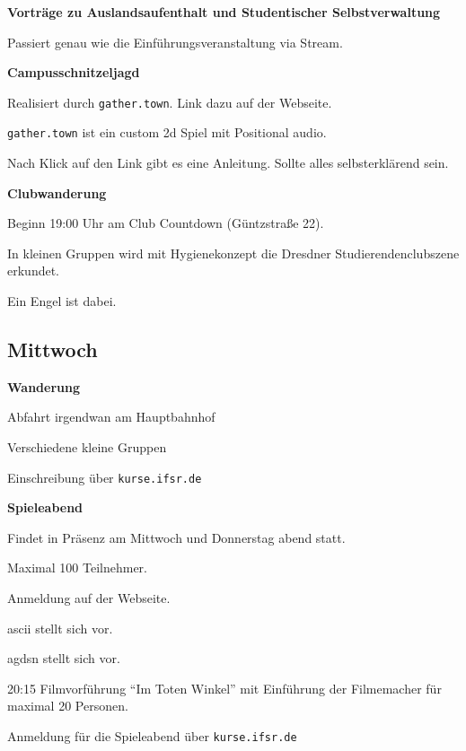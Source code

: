 \documentclass[a4paper,12pt]{scrreprt}
\begin{document}
\textbf{Vorträge zu Auslandsaufenthalt und Studentischer Selbstverwaltung}
\begin{itemize*}
    \item Passiert genau wie die Einführungsveranstaltung via Stream.
\end{itemize*}

\textbf{Campusschnitzeljagd}
\begin{itemize*}
    \item Realisiert durch \texttt{gather.town}. Link dazu auf der Webseite.
    \item \texttt{gather.town} ist ein custom 2d Spiel mit Positional audio.
    \item Nach Klick auf den Link gibt es eine Anleitung. Sollte alles selbsterklärend sein.
\end{itemize*}

\textbf{Clubwanderung}
\begin{itemize*}
    \item Beginn 19:00 Uhr am Club Countdown (Güntzstraße 22).
    \item In kleinen Gruppen wird mit Hygienekonzept die Dresdner Studierendenclubszene erkundet.
    \item Ein Engel ist dabei.
\end{itemize*}


\subsection{Mittwoch}

\textbf{Wanderung}
\begin{itemize*}
    \item Abfahrt irgendwan am Hauptbahnhof
    \item Verschiedene kleine Gruppen
    \item Einschreibung über \texttt{kurse.ifsr.de}
\end{itemize*}


\textbf{Spieleabend}
\begin{itemize*}
    \item Findet in Präsenz am Mittwoch und Donnerstag abend statt.
    \item Maximal 100 Teilnehmer.
    \item Anmeldung auf der Webseite.
    \item ascii stellt sich vor.
    \item agdsn stellt sich vor.
    \item 20:15 Filmvorführung \enquote{Im Toten Winkel} mit Einführung der Filmemacher für maximal 20 Personen.
    \item Anmeldung für die Spieleabend über \texttt{kurse.ifsr.de}
\end{itemize*}
\end{document}
